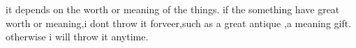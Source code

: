 it depends on the worth or meaning of the things.
if the something have great worth or meaning,i dont throw it forveer,such as a great antique ,a meaning gift.
otherwise i will throw it anytime.
